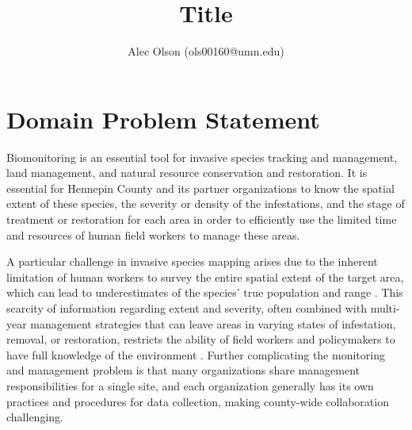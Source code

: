 \documentclass{article}
\begin{document}
\title{Title}

\author{Alec Olson (ols00160@umn.edu)}


\maketitle

\section{Domain Problem Statement}
Biomonitoring is an essential tool for invasive species tracking and management, land management, and natural resource conservation and restoration. It is essential for Hennepin County and its partner organizations to know the spatial extent of these species, the severity or density of the infestations, and the stage of treatment or restoration for each area in order to efficiently use the limited time and resources of human field workers to manage these areas.

A particular challenge in invasive species mapping arises due to the inherent limitation of human workers to survey the entire spatial extent of the target area, which can lead to underestimates of the species’ true population and range \cite{https://doi.org/10.1890/0012-9658}. This scarcity of information regarding extent and severity, often combined with multi-year management strategies that can leave areas in varying states of infestation, removal, or restoration, restricts the ability of field workers and policymakers to have full knowledge of the environment \cite{when-to-monitor-or-control}. Further complicating the monitoring and management problem is that many organizations share management responsibilities for a single site, and each organization generally has its own practices and procedures for data collection, making county-wide collaboration challenging.
\end{document}
